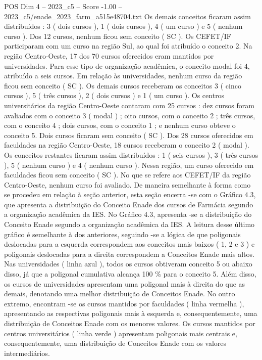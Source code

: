 \begin{textsample}{POS Dim 4 – 2023\_c5 – Score -1.00 – 2023\_c5/enade\_2023\_farm\_a515e48704.txt}
Os demais conceitos ficaram assim distribuídos : 3 ( dois cursos ), 1 ( dois cursos ), 4 ( um curso ) e 5 ( nenhum curso ).
Dos 12 cursos, nenhum ficou sem conceito ( SC ).
Os CEFET/IF participaram com um curso na região Sul, ao qual foi atribuído o conceito 2.
Na região Centro-Oeste, 17 dos 70 cursos oferecidos eram mantidos por universidades.
Para esse tipo de organização acadêmica, o conceito modal foi 4, atribuído a seis cursos.
Em relação às universidades, nenhum curso da região ficou sem conceito ( SC ).
Os demais cursos receberam os conceitos 3 ( cinco cursos ), 5 ( três cursos ), 2 ( dois cursos ) e 1 ( um curso ).
Os centros universitários da região Centro-Oeste contaram com 25 cursos : dez cursos foram avaliados com o conceito 3 ( modal ) ; oito cursos, com o conceito 2 ; três cursos, com o conceito 4 ; dois cursos, com o conceito 1 ; e nenhum curso obteve o conceito 5.
Dois cursos ficaram sem conceito ( SC ).
Dos 28 cursos oferecidos em faculdades na região Centro-Oeste, 18 cursos receberam o conceito 2 ( modal ).
Os conceitos restantes ficaram assim distribuídos : 1 ( seis cursos ), 3 ( três cursos ), 5 ( nenhum curso ) e 4 ( nenhum curso ).
Nessa região, um curso oferecido em faculdades ficou sem conceito ( SC ).
No que se refere aos CEFET/IF da região Centro-Oeste, nenhum curso foi avaliado.
De maneira semelhante à forma como se procedeu em relação à seção anterior, esta seção encerra -se com o Gráfico 4.3, que apresenta a distribuição do Conceito Enade dos cursos de Farmácia segundo a organização acadêmica da IES.
No Gráfico 4.3, apresenta -se a distribuição do Conceito Enade segundo a organização acadêmica da IES.
A leitura desse último gráfico é semelhante à dos anteriores, seguindo -se a lógica de que poligonais deslocadas para a esquerda correspondem aos conceitos mais baixos ( 1, 2 e 3 ) e poligonais deslocadas para a direita correspondem a Conceitos Enade mais altos.
Nas universidades ( linha azul ), todos os cursos obtiveram conceito 5 ou abaixo disso, já que a poligonal cumulativa alcança 100 \% para o conceito 5.
Além disso, os cursos de universidades apresentam uma poligonal mais à direita do que as demais, denotando uma melhor distribuição de Conceitos Enade.
No outro extremo, encontram -se os cursos mantidos por faculdades ( linha vermelha ), apresentando as respectivas poligonais mais à esquerda e, consequentemente, uma distribuição de Conceitos Enade com os menores valores.
Os cursos mantidos por centros universitários ( linha verde ) apresentam poligonais mais centrais e, consequentemente, uma distribuição de Conceitos Enade com os valores intermediários.

\end{textsample}
